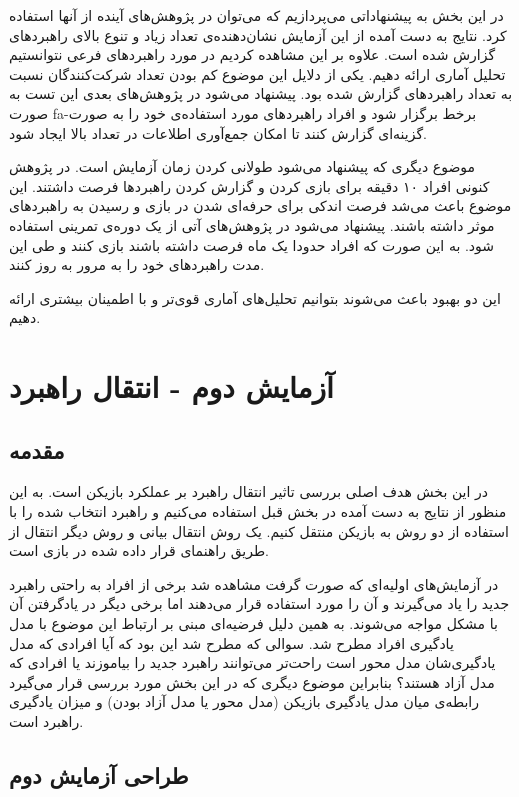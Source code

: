 \documentclass[twoside, a4paper,11pt]{book}
\numberwithin{equation}{chapter}
\numberwithin{table}{chapter}
\numberwithin{figure}{chapter}
\numberwithin{equation}{chapter}
\newcommand{\mls}[1]{\gls{fa-#1}\glsuseri{la-#1}}
\begin{document}
در این بخش به پیشنهاداتی می‌پردازیم که می‌توان در پژوهش‌های آینده از آنها استفاده کرد. نتایج به دست آمده از این آزمایش نشان‌دهنده‌ی تعداد زیاد و تنوع بالای راهبردهای گزارش شده است. علاوه بر این مشاهده کردیم در مورد راهبردهای فرعی نتوانستیم تحلیل آماری ارائه دهیم. یکی از دلایل این موضوع کم بودن تعداد شرکت‌کنندگان نسبت به تعداد راهبردهای گزارش شده بود. پیشنهاد می‌شود در پژوهش‌های بعدی این تست به صورت \mls{برخط} برگزار شود و افراد راهبردهای مورد استفاده‌ی خود را به صورت گزینه‌ای گزارش کنند تا امکان جمع‌آوری اطلاعات در تعداد بالا ایجاد شود.

موضوع دیگری که پیشنهاد می‌شود طولانی کردن زمان آزمایش است. در پژوهش کنونی افراد ۱۰ دقیقه برای بازی کردن و گزارش کردن راهبردها فرصت داشتند. این موضوع باعث می‌شد فرصت اندکی برای حرفه‌ای شدن در بازی و رسیدن به راهبردهای موثر داشته باشند. پیشنهاد می‌شود در پژوهش‌های آتی از یک دوره‌ی تمرینی استفاده شود. به این صورت که افراد حدودا یک ماه فرصت داشته باشند بازی کنند و طی این مدت راهبردهای خود را به مرور به روز کنند.

این دو بهبود باعث می‌شوند بتوانیم تحلیل‌های آماری قوی‌تر و با اطمینان بیشتری ارائه دهیم.

\chapter{آزمایش دوم - انتقال راهبرد}
\label{chapter:PartTwoTransfer}
\thispagestyle{plain}

\section{مقدمه}
در این بخش هدف اصلی بررسی تاثیر انتقال راهبرد بر عملکرد بازیکن است. به این منظور از نتایج به دست آمده در بخش قبل استفاده می‌کنیم و راهبرد انتخاب شده را با استفاده از دو روش به بازیکن منتقل کنیم. یک روش انتقال بیانی و روش دیگر انتقال از طریق راهنمای قرار داده شده در بازی است.

در آزمایش‌های اولیه‌ای که صورت گرفت مشاهده شد برخی از افراد به راحتی راهبرد جدید را یاد می‌گیرند و آن را مورد استفاده قرار می‌دهند اما برخی دیگر در یادگرفتن آن با مشکل مواجه می‌شوند. به همین دلیل فرضیه‌ای مبنی بر ارتباط این موضوع با مدل یادگیری افراد مطرح شد. سوالی که مطرح شد این بود که آیا افرادی که مدل یادگیری‌شان مدل محور است راحت‌تر می‌توانند راهبرد جدید را بیاموزند یا افرادی که مدل آزاد هستند؟ بنابراین موضوع دیگری که در این بخش مورد بررسی قرار می‌گیرد رابطه‌ی میان مدل یادگیری بازیکن (مدل محور یا مدل آزاد بودن) و میزان یادگیری راهبرد است. 

\section{طراحی آزمایش دوم}
\end{document}
